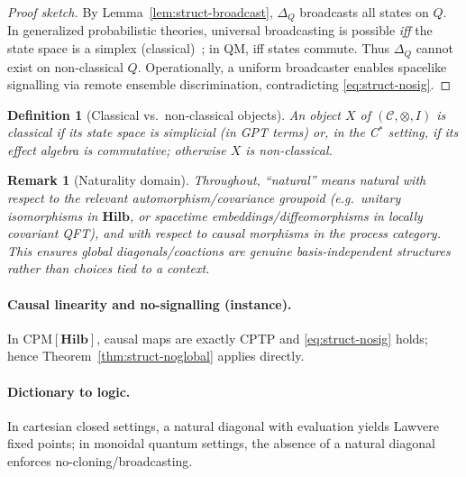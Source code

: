 \documentclass[11pt]{article}
\theoremstyle{upright}
\newtheorem{definition}{Definition}
\newtheorem{remark}{Remark}
\begin{document}
\begin{proof}[Proof sketch]
By Lemma~\ref{lem:struct-broadcast}, $\Delta_Q$ broadcasts all states on $Q$.  In generalized probabilistic theories, universal broadcasting is possible \emph{iff} the state space is a simplex (classical)~\cite{BarnumEtAl2007}; in QM, iff states commute. Thus $\Delta_Q$ cannot exist on non-classical $Q$. Operationally, a uniform broadcaster enables spacelike signalling via remote ensemble discrimination, contradicting \eqref{eq:struct-nosig}.
\end{proof}

\begin{definition}[Classical vs.\ non-classical objects]
An object $X$ of $(\mathcal C,\otimes,I)$ is \emph{classical} if its state space is simplicial (in GPT terms) or, in the C$^\ast$ setting, if its effect algebra is commutative; otherwise $X$ is \emph{non-classical}.
\end{definition}

\begin{remark}[Naturality domain]
Throughout, ``natural'' means natural with respect to the relevant automorphism/covariance groupoid (e.g.\ unitary isomorphisms in $\mathbf{Hilb}$, or spacetime embeddings/diffeomorphisms in locally covariant QFT), and with respect to causal morphisms in the process category. This ensures global diagonals/coactions are genuine basis-independent structures rather than choices tied to a context.
\end{remark}


\paragraph{Causal linearity and no-signalling (instance).}
In $\mathrm{CPM}[\mathbf{Hilb}]$, causal maps are exactly CPTP and \eqref{eq:struct-nosig} holds; hence Theorem~\ref{thm:struct-noglobal} applies directly.

\paragraph{Dictionary to logic.}
In cartesian closed settings, a natural diagonal with evaluation yields Lawvere fixed points; in monoidal quantum settings, the absence of a natural diagonal enforces no-cloning/broadcasting.
\end{document}
